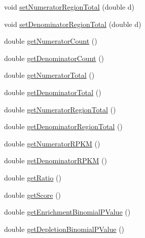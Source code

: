 \begin{DoxyCompactItemize}
\item 
void \hyperlink{classumms_1_1core_1_1model_1_1score_1_1_new_ratio_score_a15d898583a458c1cf1db03757f42a58e}{set\+Numerator\+Region\+Total} (double d)
\item 
void \hyperlink{classumms_1_1core_1_1model_1_1score_1_1_new_ratio_score_a53d82776cf61bbf4ba0c3dec5abf85e0}{set\+Denominator\+Region\+Total} (double d)
\item 
double \hyperlink{classumms_1_1core_1_1model_1_1score_1_1_new_ratio_score_a30acd35178f2104d19e57812869c583c}{get\+Numerator\+Count} ()
\item 
double \hyperlink{classumms_1_1core_1_1model_1_1score_1_1_new_ratio_score_a93b23e58ece71cc054f535d97722c709}{get\+Denominator\+Count} ()
\item 
double \hyperlink{classumms_1_1core_1_1model_1_1score_1_1_new_ratio_score_a450ef192f2f085afc2a59d0687772b35}{get\+Numerator\+Total} ()
\item 
double \hyperlink{classumms_1_1core_1_1model_1_1score_1_1_new_ratio_score_af100d5f2aa2c974efdbe258ab25df026}{get\+Denominator\+Total} ()
\item 
double \hyperlink{classumms_1_1core_1_1model_1_1score_1_1_new_ratio_score_ac413fbfe0bff20f164ac39e730b00dab}{get\+Numerator\+Region\+Total} ()
\item 
double \hyperlink{classumms_1_1core_1_1model_1_1score_1_1_new_ratio_score_a5099065a98b37f2f8ced26c490b34815}{get\+Denominator\+Region\+Total} ()
\item 
double \hyperlink{classumms_1_1core_1_1model_1_1score_1_1_new_ratio_score_a5895395a7e81a482257c8f28175ba67a}{get\+Numerator\+R\+P\+K\+M} ()
\item 
double \hyperlink{classumms_1_1core_1_1model_1_1score_1_1_new_ratio_score_af6a7ce43a225b3ae9b37cdd7080ade0b}{get\+Denominator\+R\+P\+K\+M} ()
\item 
double \hyperlink{classumms_1_1core_1_1model_1_1score_1_1_new_ratio_score_a241f72296f12599ebbc03f6b6babc9b6}{get\+Ratio} ()
\item 
double \hyperlink{classumms_1_1core_1_1model_1_1score_1_1_new_ratio_score_abc8dd462110ee0768011709ea84b9346}{get\+Score} ()
\item 
double \hyperlink{classumms_1_1core_1_1model_1_1score_1_1_new_ratio_score_a536d07d5066c4e0ddfee6f73f3dfaac0}{get\+Enrichment\+Binomial\+P\+Value} ()
\item 
double \hyperlink{classumms_1_1core_1_1model_1_1score_1_1_new_ratio_score_aa01e2e91cb8482d0d67493814b8afa4a}{get\+Depletion\+Binomial\+P\+Value} ()

\end{DoxyCompactItemize}
